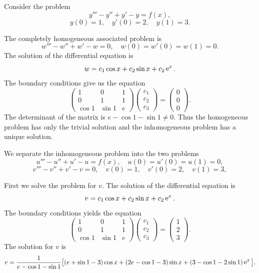 \begin{Example}
  Consider the problem
  \[
  y'''-y''+y'-y=f(x),
  \]
  \[
  y(0)=1, \quad y'(0)=2, \quad y(1)=3.
  \]

  The completely homogeneous associated problem is
  \[
  w'''-w''+w'-w=0, \quad w(0)= w'(0)= w(1)=0.
  \]
  The solution of the differential equation is
  \[
  w = c_1 \cos x + c_2 \sin x + c_2 \mathop{\mathrm{e}}\nolimits^x.
  \]
  The boundary conditions give us the equation
  \[
  \begin{pmatrix}
    1 & 0 & 1 \\
    0 & 1 & 1 \\
    \cos 1 & \sin 1 & e
  \end{pmatrix}
  \begin{pmatrix}
    c_1 \\
    c_2 \\
    c_3
  \end{pmatrix}
  =
  \begin{pmatrix}
    0 \\ 
    0 \\
    0
  \end{pmatrix}.
  \]
  The determinant of the matrix is $e-\cos 1-\sin 1 \neq 0$.  
  Thus the homogeneous problem has only the trivial solution and the 
  inhomogeneous problem has a unique solution.

  We separate the inhomogeneous problem into the two problems
  \[
  u'''-u''+u'-u=f(x),\quad u(0)=u'(0)=u(1)=0,
  \]
  \[
  v'''-v''+v'-v=0,\quad v(0)=1, \quad v'(0)=2, \quad v(1)=3,
  \]

  First we solve the problem for $v$.  The solution of the differential equation
  is
  \[
  v = c_1 \cos x + c_2 \sin x + c_2 \mathop{\mathrm{e}}\nolimits^x.
  \]
  The boundary conditions yields the equation
  \[
  \begin{pmatrix}
    1 & 0 & 1 \\
    0 & 1 & 1 \\
    \cos 1 & \sin 1 & e
  \end{pmatrix}
  \begin{pmatrix}
    c_1 \\
    c_2 \\
    c_3
  \end{pmatrix}
  =
  \begin{pmatrix}
    1 \\ 
    2 \\
    3
  \end{pmatrix}.
  \]
  The solution for $v$ is
  \[
  v = \frac{1}{e - \cos 1 - \sin 1} \big[ (e+\sin 1 - 3)\cos x 
  + (2e - \cos 1 - 3) \sin x + (3 - \cos 1 - 2 \sin 1) \mathop{\mathrm{e}}\nolimits^x \big].
  \]




\end{Example}
